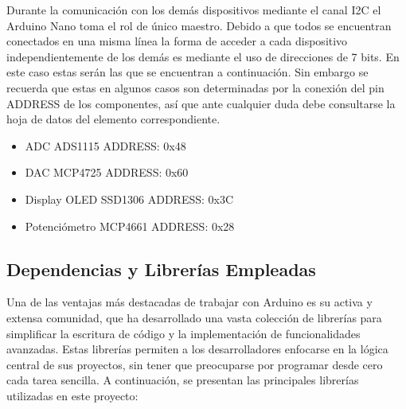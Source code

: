 Durante la comunicación con los demás dispositivos mediante el canal I2C el Arduino Nano toma el rol de único maestro. Debido a que todos se encuentran conectados en una misma línea la forma de acceder a cada dispositivo independientemente de los demás es mediante el uso de direcciones de 7 bits. En este caso estas serán las que se encuentran a continuación. Sin embargo se recuerda que estas en algunos casos son determinadas por la conexión del pin ADDRESS de los componentes, así que ante cualquier duda debe consultarse la hoja de datos del elemento correspondiente.
\begin{itemize}
    \item ADC ADS1115 \cite{ADS1115} ADDRESS: 0x48
    \item DAC MCP4725\cite{MCP4725} ADDRESS: 0x60
    \item Display OLED SSD1306 \cite{SSD1306} ADDRESS: 0x3C
    \item Potenciómetro MCP4661 \cite{MCP4661} ADDRESS: 0x28
\end{itemize}

\subsection{Dependencias y Librerías Empleadas}

Una de las ventajas más destacadas de trabajar con Arduino es su activa y extensa comunidad, que ha desarrollado una vasta colección de librerías para simplificar la escritura de código y la implementación de funcionalidades avanzadas. Estas librerías permiten a los desarrolladores enfocarse en la lógica central de sus proyectos, sin tener que preocuparse por programar desde cero cada tarea sencilla. A continuación, se presentan las principales librerías utilizadas en este proyecto:

